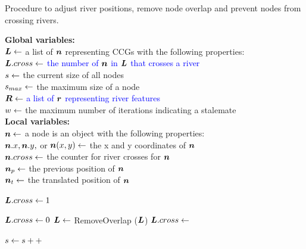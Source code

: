 \begin{algorithm}[tb!]
    \caption{Procedure to adjust river positions, remove node overlap and prevent nodes from crossing rivers.}\label{alg:UpdateLayout}
    \textbf{Global variables:} \\
    $ \bm{L} \gets $ a list of $ \bm{n} $ representing CCGs with the following properties: \\
    \-\hspace{1em}  \textcolor{blue}{$\bm{L}.cross \gets $ the number of $ \bm{n} $ in $ \bm{L} $ that crosses a river} \\
    $ s \gets $ the current size of all nodes \\
    $ s_{max} \gets $ the maximum size of a node \\
    \textcolor{blue}{ $ \bm{R} \gets $ a list of $ \bm{r} $ representing river features} \\
    $ w \gets $ the maximum number of iterations indicating a stalemate \\

    \textbf{Local variables:} \\
    $ \bm{n} \gets $ a node is an object with the following properties: \\
    \-\hspace{1em} $ \bm{n}.x, \bm{n}.y, $ or $ \bm{n}(x,y) \gets $ the x and y coordinates of $ \bm{n} $ \\
    \-\hspace{1em} $ \bm{n}.cross \gets $ the counter for river crosses for $ \bm{n} $ \\
    \-\hspace{1em} $ \bm{n}_{p} \gets $ the previous position of $ \bm{n} $ \\
    \-\hspace{1em} $ \bm{n}_t \gets $ the translated position of $ \bm{n} $ \\

    \begin{algorithmic}[1]
        \While{$ \nodeSize < \nodeSizeMax $}
            \State \textcolor{blue}{$ \bm{L}.cross \gets 1 $ }

                \State $ \bm{L}.cross \gets 0 $
                \State $ \bm{L} \gets $ RemoveOverlap ($ \bm{L} $)
                \color{blue}
                \State {}
                \State $\bm{L}.cross \gets $ 

                \color{black}

            \EndWhile

            \State $ s \gets s ++$

        \EndWhile

        \EndProcedure
    \end{algorithmic}
\end{algorithm}


